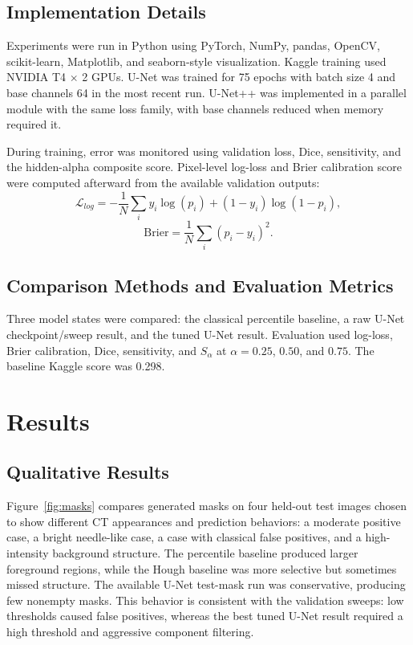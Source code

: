 \documentclass[10pt]{article}
\begin{document}
\subsection{Implementation Details}
Experiments were run in Python using PyTorch, NumPy, pandas, OpenCV, scikit-learn, Matplotlib, and seaborn-style visualization. Kaggle training used NVIDIA T4 $\times$ 2 GPUs. U-Net was trained for 75 epochs with batch size 4 and base channels 64 in the most recent run. U-Net++ was implemented in a parallel module with the same loss family, with base channels reduced when memory required it.

During training, error was monitored using validation loss, Dice, sensitivity, and the hidden-alpha composite score. Pixel-level log-loss and Brier calibration score were computed afterward from the available validation outputs:
\begin{equation}
\mathcal{L}_{log}=-\frac{1}{N}\sum_i y_i\log(p_i)+(1-y_i)\log(1-p_i),
\end{equation}
\begin{equation}
\mathrm{Brier}=\frac{1}{N}\sum_i(p_i-y_i)^2.
\end{equation}

\subsection{Comparison Methods and Evaluation Metrics}
Three model states were compared: the classical percentile baseline, a raw U-Net checkpoint/sweep result, and the tuned U-Net result. Evaluation used log-loss, Brier calibration, Dice, sensitivity, and $S_{\alpha}$ at $\alpha=0.25$, $0.50$, and $0.75$. The baseline Kaggle score was 0.298.

\section{Results}
\subsection{Qualitative Results}
Figure~\ref{fig:masks} compares generated masks on four held-out test images chosen to show different CT appearances and prediction behaviors: a moderate positive case, a bright needle-like case, a case with classical false positives, and a high-intensity background structure. The percentile baseline produced larger foreground regions, while the Hough baseline was more selective but sometimes missed structure. The available U-Net test-mask run was conservative, producing few nonempty masks. This behavior is consistent with the validation sweeps: low thresholds caused false positives, whereas the best tuned U-Net result required a high threshold and aggressive component filtering.
\end{document}

